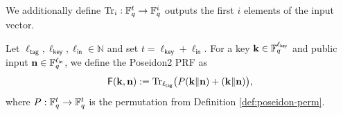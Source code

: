 We additionally define
$\mathrm{Tr}_i:\mathbb{F}_q^t\to \mathbb{F}_q^{i}$ outputs the first $i$ elements of the input vector.

\begin{definition}\label{def:poseidon-prf}
Let $\ell_{\mathsf{tag}},\ell_{\mathsf{key}},\ell_{\mathsf{in}}\in \mathbb{N}$ and set $t=\ell_{\mathsf{key}}+\ell_{\mathsf{in}}$. For a key 
 $\mathbf{k}\in\mathbb{F}_q^{\ell_{\mathsf{key}}}$  and public input 
$\mathbf{n} \in\mathbb{F}_q^{\ell_{\mathsf{in}}}$, we define the Poseidon2 PRF as 
\[
  \mathsf{F}(\mathbf{k},\mathbf{n}) := \mathrm{Tr}_{\ell_{\mathsf{tag}}}\big(P(\mathbf{k}\Vert \mathbf{n}) + (\mathbf{k}\Vert \mathbf{n})\big),
\]
where $P:\mathbb{F}_q^t\to \mathbb{F}_q^t$ is the permutation from Definition \ref{def:poseidon-perm}.
\end{definition}
